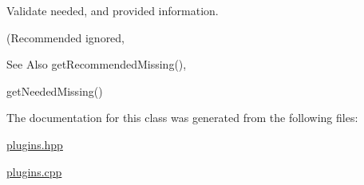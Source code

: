 Validate needed, and provided information. 

(Recommended ignored, \begin{DoxySeeAlso}{See Also}
get\-Recommended\-Missing(), 

get\-Needed\-Missing() 
\end{DoxySeeAlso}


The documentation for this class was generated from the following files\-:\begin{DoxyCompactItemize}
\item 
\hyperlink{plugins_8hpp}{plugins.\-hpp}\item 
\hyperlink{plugins_8cpp}{plugins.\-cpp}\end{DoxyCompactItemize}
